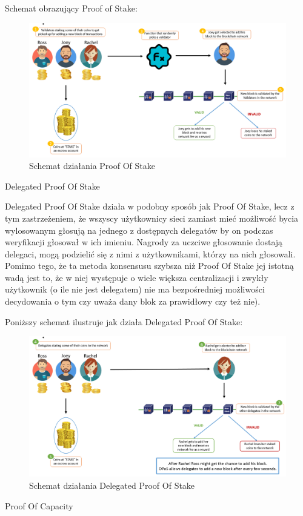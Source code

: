 \vspace{1em}

Schemat obrazujący Proof of Stake:
\begin{figure}[H]
    \centering
    \includegraphics[width=\textwidth]{Images/ConsensusPOS.png}
    \caption{Schemat działania Proof Of Stake}
    \label{fig:ConsensusPOS}
\end{figure}
Delegated Proof Of Stake

\vspace{1em}

Delegated Proof Of Stake działa w podobny sposób jak Proof Of Stake, lecz z tym zastrzeżeniem, że wszyscy użytkownicy sieci zamiast mieć możliwość bycia wylosowanym głosują na jednego z dostępnych delegatów by on podczas weryfikacji głosował w ich imieniu. Nagrody za uczciwe głosowanie dostają delegaci, mogą podzielić się z nimi z użytkownikami, którzy na nich głosowali. Pomimo tego, że ta metoda konsensusu szybsza niż Proof Of Stake jej istotną wadą jest to, że w niej występuje o wiele większa centralizacji i zwykły użytkownik (o ile nie jest delegatem) nie ma bezpośredniej możliwości decydowania o tym czy uważa dany blok za prawidłowy czy też nie).

\vspace{1em}

Poniższy schemat ilustruje jak działa Delegated Proof Of Stake:
\begin{figure}[H]
    \centering
    \includegraphics[width=\textwidth]{Images/ConsensusDPOS.png}
    \caption{Schemat działania Delegated Proof Of Stake}
    \label{fig:ConsensusDPOS}
\end{figure}
Proof Of Capacity

